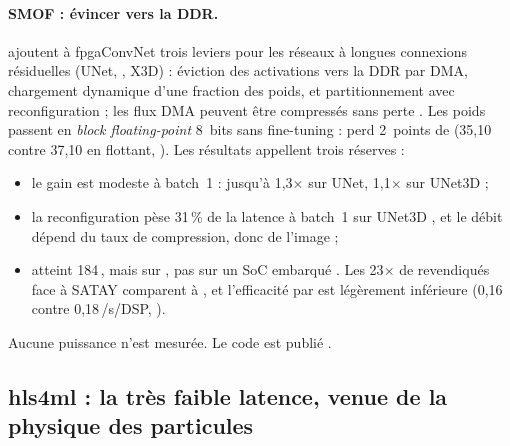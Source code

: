 \paragraph{SMOF : évincer vers la DDR.}
\citet{arxiv-2403.18921-smof-streaming-modern-cnns-fpgas}\pp{} ajoutent à fpgaConvNet
trois leviers pour les réseaux à longues connexions résiduelles (UNet, , X3D) : éviction
des activations vers la DDR par DMA, chargement dynamique d'une fraction des poids, et
partitionnement avec reconfiguration ; les flux DMA peuvent être compressés sans perte
. Les poids passent en \emph{block floating-point} 8~bits sans
fine-tuning  :  perd 2~points de  (35,10 contre 37,10 en flottant,
). Les
résultats appellent trois réserves :
\begin{itemize}
  \item le gain est modeste à batch~1 : jusqu'à 1,3$\times$ sur UNet, 1,1$\times$ sur
    UNet3D  ;
  \item la reconfiguration pèse 31\,\% de la latence à batch~1 sur UNet3D ,
    et le débit dépend du taux de compression, donc de l'image  ;
  \item {} atteint 184\,, mais sur , pas sur un SoC embarqué
    . Les 23$\times$ de  revendiqués face à
    SATAY comparent  à , et l'efficacité par  est légèrement inférieure
    (0,16 contre 0,18\,/s/DSP, ).
\end{itemize}
Aucune puissance n'est mesurée. Le code est publié .

\subsection{hls4ml : la très faible latence, venue de la physique des particules}

